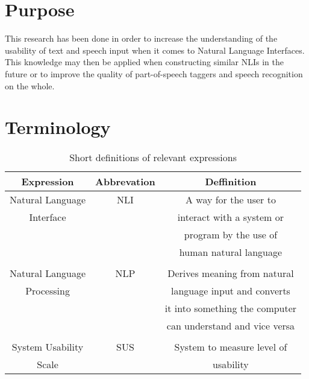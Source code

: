\section{Purpose}
This research has been done in order to increase the understanding of the usability of text and speech input when it comes to Natural Language Interfaces. This knowledge may then be applied when constructing similar NLIs in the future or to improve the quality of part-of-speech taggers and speech recognition on the whole.


\section{Terminology}

\begin{table}[ht]
  \centering
  \begin{tabular}{ccc}
    \toprule
    Expression & Abbrevation & Deffinition\\
    \midrule
    Natural Language & NLI & A way for the user to\\
    Interface & & interact with a system or\\ 
    & & program by the use of\\
    & & human natural language\\
    \\
    Natural Language & NLP & Derives meaning from natural\\
    Processing & & language input and converts\\
    & & it into something the computer\\
    & & can understand and vice versa\\
    \\
    System Usability & SUS & System to measure level of\\
    Scale & &  usability\\
    \bottomrule
  \end{tabular}
  \caption{Short definitions of relevant expressions}\label{termin}
\end{table}
